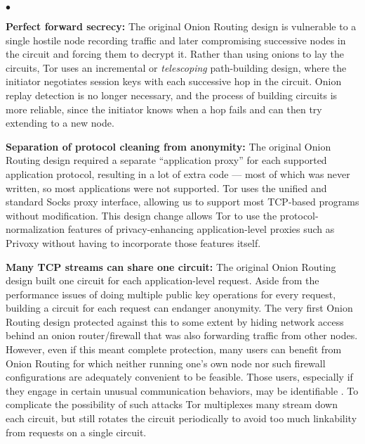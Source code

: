 \documentclass[times,10pt,twocolumn]{article}
\newenvironment{tightlist}{\begin{list}{$\bullet$}{
  \setlength{\itemsep}{0mm}
    \setlength{\parsep}{0mm}
    }}{\end{list}}
\begin{document}
\begin{tightlist}

\item \textbf{Perfect forward secrecy:} The original Onion Routing
design is vulnerable to a single hostile node recording traffic and later
compromising successive nodes in the circuit and forcing them to
decrypt it. 
Rather than using
onions to lay the circuits, Tor uses an incremental or \emph{telescoping}
path-building design, where the initiator negotiates session keys with
each successive hop in the circuit. Onion replay detection is no longer
necessary, and the process of building circuits is more reliable, since
the initiator knows when a hop fails and can then try extending to a new node.


\item \textbf{Separation of protocol cleaning from anonymity:}
The original Onion Routing design required a separate ``application
proxy'' for each
supported application protocol, resulting in a lot of extra code --- most
of which was never written, so most applications were not supported.
Tor uses the unified and standard Socks
\cite{socks4,socks5} proxy interface, allowing us to support most TCP-based
programs without modification.  This design change allows Tor to
use the protocol-normalization features of privacy-enhancing
application-level proxies such as Privoxy without having to
incorporate those features itself.

\item \textbf{Many TCP streams can share one circuit:} The original
Onion Routing design built one circuit for each application-level
request. 
Aside from the performance issues of doing multiple public key
operations for every request, building a circuit for each request can
endanger anonymity.
The very first Onion Routing design \cite{or-ih96} protected against
this to some extent by hiding network access behind an onion
router/firewall that was also forwarding traffic from other nodes.
However, even if this meant complete protection, many users can
benefit from Onion Routing for which neither running one's own node
nor such firewall configurations are adequately convenient to be
feasible. Those users, especially if they engage in certain unusual
communication behaviors, may be identifiable \cite{wright03}. To
complicate the possibility of such attacks Tor multiplexes many
stream down each circuit, but still rotates the circuit
periodically to avoid too much linkability from requests on a single
circuit.


\end{tightlist}
\end{document}
